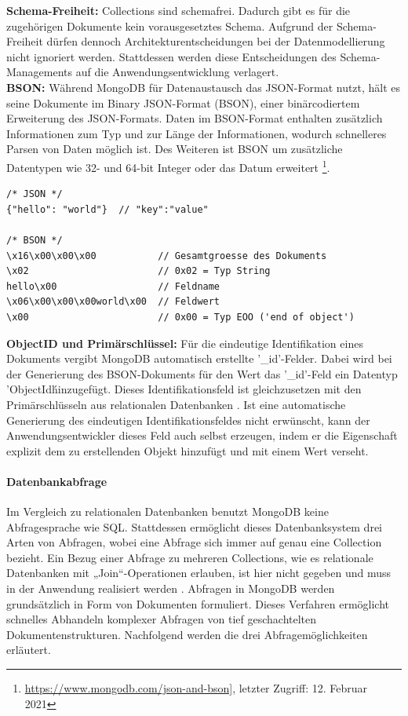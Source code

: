 \noindent
\textbf{Schema-Freiheit:}
Collections sind schemafrei. Dadurch gibt es für die zugehörigen Dokumente kein vorausgesetztes Schema. Aufgrund der Schema-Freiheit dürfen dennoch Architekturentscheidungen bei der Datenmodellierung nicht ignoriert werden. Stattdessen werden diese Entscheidungen des Schema-Managements auf die Anwendungsentwicklung verlagert. \\

\noindent
\textbf{BSON:}
Während MongoDB für Datenaustausch das JSON-Format nutzt, hält es seine Dokumente im Binary JSON-Format (BSON), einer binärcodiertem Erweiterung des JSON-Formats. Daten im BSON-Format enthalten zusätzlich Informationen zum Typ und zur Länge der Informationen, wodurch schnelleres Parsen von Daten möglich ist. Des Weiteren ist BSON um zusätzliche Datentypen wie 32- und 64-bit Integer oder das Datum erweitert \footnote{\url{https://www.mongodb.com/json-and-bson]}, letzter Zugriff: 12. Februar 2021}.

\begin{lstlisting}[caption=JSON - BSON Vergleich, label=lst:JSONBSON]
/* JSON */
{"hello": "world"}  // "key":"value"

/* BSON */
\x16\x00\x00\x00           // Gesamtgroesse des Dokuments
\x02                       // 0x02 = Typ String
hello\x00                  // Feldname
\x06\x00\x00\x00world\x00  // Feldwert
\x00                       // 0x00 = Typ EOO ('end of object')
\end{lstlisting}


\noindent
\textbf{ObjectID und Primärschlüssel:}
Für die eindeutige Identifikation eines Dokuments vergibt MongoDB automatisch erstellte '\_id'-Felder. Dabei wird bei der Generierung des BSON-Dokuments für den Wert das '\_id'-Feld ein Datentyp 'ObjectId\'  hinzugefügt. Dieses Identifikationsfeld ist gleichzusetzen mit den Primärschlüsseln aus relationalen Datenbanken \cite{DB1.85}. Ist eine automatische Generierung des eindeutigen Identifikationsfeldes nicht erwünscht, kann der Anwendungsentwickler dieses Feld auch selbst erzeugen, indem er die Eigenschaft explizit dem zu erstellenden Objekt hinzufügt und mit einem Wert verseht.
\newline

\paragraph{Datenbankabfrage}
Im Vergleich zu relationalen Datenbanken benutzt MongoDB keine Abfragesprache wie SQL. Stattdessen ermöglicht dieses Datenbanksystem drei Arten von Abfragen, wobei eine Abfrage sich immer auf genau eine Collection bezieht. Ein Bezug einer Abfrage zu mehreren Collections, wie es relationale Datenbanken mit „Join“-Operationen erlauben, ist hier nicht gegeben und muss in der Anwendung realisiert werden \cite{DB1.9}. Abfragen in MongoDB werden grundsätzlich in Form von Dokumenten formuliert. Dieses Verfahren ermöglicht schnelles Abhandeln komplexer Abfragen von tief geschachtelten Dokumentenstrukturen. Nachfolgend werden die drei Abfragemöglichkeiten erläutert.\\

